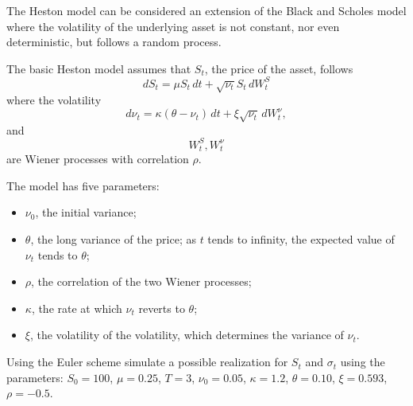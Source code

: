 \documentclass[12pt,a4paper]{article}
\begin{document}
\begin{question}
The Heston model can be considered an extension of the Black and Scholes model where the volatility of the underlying asset is not constant, nor even deterministic, but follows a random process.

The basic Heston model assumes that $S_t$, the price of the asset, follows
\begin{equation}
dS_{t}=\mu S_{t}\,dt+{\sqrt {\nu _{t}}}S_{t}\,dW_{t}^{S}
\end{equation}
where the volatility 
\begin{equation}
{\displaystyle d\nu _{t}=\kappa (\theta -\nu _{t})\,dt+\xi {\sqrt {\nu _{t}}}\,dW_{t}^{\nu },}
\end{equation}
and 
\begin{equation}
W_{t}^{S},W_{t}^{\nu }
\end{equation} 
are Wiener processes with correlation $\rho$.

The model has five parameters:
\begin{itemize}
\item $\nu _0$, the initial variance;
\item $\theta$, the long variance of the price; as $t$ tends to infinity, the expected value of $\nu_t$ tends to $\theta$;
\item $\rho$, the correlation of the two Wiener processes;
\item $\kappa$, the rate at which $\nu_t$ reverts to $\theta$;
\item $\xi$, the volatility of the volatility, which determines the variance of $\nu_t$.
\end{itemize}

Using the Euler scheme simulate a possible realization for $S_t$ and $\sigma_t$ using the parameters: $S_0=100$, $\mu=0.25$, $T=3$, $\nu_0=0.05$, $\kappa=1.2$, $\theta=0.10$, $\xi=0.593$, $\rho=-0.5$.

\end{question}

\end{document}
